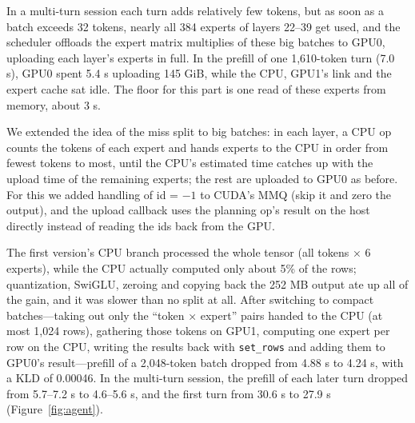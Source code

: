 \documentclass[11pt,a4paper]{article}
\newcommand{\code}[1]{\texttt{#1}}
\begin{document}
In a multi-turn session each turn adds relatively few tokens, but as soon as a batch exceeds 32 tokens, nearly all 384 experts of layers 22--39 get used, and the scheduler offloads the expert matrix multiplies of these big batches to GPU0, uploading each layer's experts in full. In the prefill of one 1,610-token turn (7.0 s), GPU0 spent 5.4 s uploading 145 GiB, while the CPU, GPU1's link and the expert cache sat idle. The floor for this part is one read of these experts from memory, about 3 s.

We extended the idea of the miss split to big batches: in each layer, a CPU op counts the tokens of each expert and hands experts to the CPU in order from fewest tokens to most, until the CPU's estimated time catches up with the upload time of the remaining experts; the rest are uploaded to GPU0 as before. For this we added handling of id = $-1$ to CUDA's MMQ (skip it and zero the output), and the upload callback uses the planning op's result on the host directly instead of reading the ids back from the GPU.

The first version's CPU branch processed the whole tensor (all tokens × 6 experts), while the CPU actually computed only about 5\% of the rows; quantization, SwiGLU, zeroing and copying back the 252 MB output ate up all of the gain, and it was slower than no split at all. After switching to compact batches---taking out only the ``token × expert'' pairs handed to the CPU (at most 1,024 rows), gathering those tokens on GPU1, computing one expert per row on the CPU, writing the results back with \code{set\_rows} and adding them to GPU0's result---prefill of a 2,048-token batch dropped from 4.88 s to 4.24 s, with a KLD of 0.00046. In the multi-turn session, the prefill of each later turn dropped from 5.7--7.2 s to 4.6--5.6 s, and the first turn from 30.6 s to 27.9 s (Figure~\ref{fig:agent}).
\end{document}
